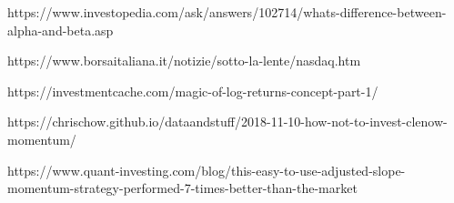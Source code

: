 \documentclass[twocolumn]{article}
\begin{document}
\begin{thebibliography}{99} 

\bibitem https://www.investopedia.com/ask/answers/102714/whats-difference-between-alpha-and-beta.asp
 

\bibitem https://www.borsaitaliana.it/notizie/sotto-la-lente/nasdaq.htm

\bibitem https://investmentcache.com/magic-of-log-returns-concept-part-1/

\bibitem https://chrischow.github.io/dataandstuff/2018-11-10-how-not-to-invest-clenow-momentum/

\bibitem https://www.quant-investing.com/blog/this-easy-to-use-adjusted-slope-momentum-strategy-performed-7-times-better-than-the-market

 
\end{thebibliography}
\end{document}
